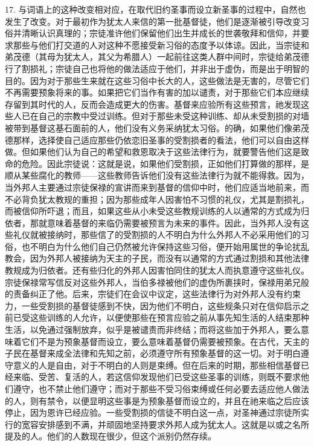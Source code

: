17. 与词语上的这种改变相对应，在取代旧约圣事而设立新圣事的过程中，自然也发生了改变。对于最初作为犹太人来信的第一批基督徒，他们是逐渐被引导改变习俗并清晰认识真理的；宗徒准许他们保留他们出生并成长的世袭敬拜和信仰，并要求那些与他们打交道的人对这种不愿接受新习俗的态度予以体谅。因此，当宗徒和弟茂德（其母为犹太人，其父为希腊人）一起前往这类人群中间时，宗徒给弟茂德行了割损礼；宗徒自己也将他的做法适应于他们，并非出于虚伪，而是出于明智的目的。因为对于那些生来就在这些习俗中长大的人，这些做法是无害的，尽管它们不再需要预象将来的事。如果把它们当作有害的加以谴责，对于那些它们本应继续存留到其时代的人，反而会造成更大的伤害。基督来应验所有这些预言，祂发现这些人已在自己的宗教中受过训练。但对于那些未受这种训练、却从未受割损的对墙被带到基督这基石面前的人，他们没有义务采纳犹太习俗。的确，如果他们像弟茂德那样，选择使自己适应那些仍依恋旧圣事的受割损者的看法，他们可以自由这样做。但如果他们认为自己的希望和救恩取决于这些法律行为，就要警告他们这是致命的危险。因此宗徒说：这就是说，如果他们受割损，正如他们打算做的那样，是顺从某些腐化的教师——这些教师告诉他们没有这些法律行为就不能得救。因为，当外邦人主要通过宗徒保禄的宣讲而来到基督的信仰中时，他们应适当地前来，而不必背负犹太教规的重担；因为那些成年人因害怕不习惯的礼仪，尤其是割损礼，而被信仰所吓退；而且，如果这些从小未受这些教规训练的人以通常的方式成为归依者，那就意味着基督的来临仍需要被预言为未来的事件。因此，当外邦人没有这些礼仪就被接纳时，那些信了的受割损的人不明白为什么外邦人不必采用他们的习俗，也不明白为什么他们自己仍然被允许保持这些习俗，便开始用属世的争论扰乱教会，因为外邦人被接纳为天主的子民，而没有以通常的方式通过割损和其他法律教规成为归依者。还有些归化的外邦人因害怕同住的犹太人而执意遵守这些礼仪。宗徒保禄常写信反对这些外邦人，当伯多禄被他们的虚伪所裹挟时，保禄用弟兄般的责备纠正了他。后来，宗徒们在会议中议定，这些法律行为对外邦人没有约束力，一些受割损的基督徒感到不快，因为他们不明白，这些规条只对在信仰启示之前已受这些训练的人允许，以便使那些在预言应验之前从事先知生活的人结束那种生活，以免通过强制放弃，似乎是被谴责而非终结；而将这些加于外邦人，要么意味着它们不是为预象基督而设立，要么意味着基督仍需要被预象。在古代，天主的子民在基督来成全法律和先知之前，必须遵守所有预象基督的这一切。对于明白遵守意义的人是自由，对于不明白的人则是束缚。但在后来的时期，那些相信基督已经来临、受苦、复活的人，若这信仰发现他们已受这些圣事的训练，则既不要求他们遵守，也不禁止他们遵守；而对于那些不受习俗束缚或任何必要去适应他人做法的人，则有禁令，以便显明这些事是为预象基督而设立的，并且在祂来临之后应该停止，因为恩许已经应验。一些受割损的信徒不明白这一点，对圣神通过宗徒所实行的宽容安排感到不满，并顽固地坚持要求外邦人成为犹太人。这就是以或之名所提及的人。他们的人数现在很少，但这个派别仍然存续。\par

